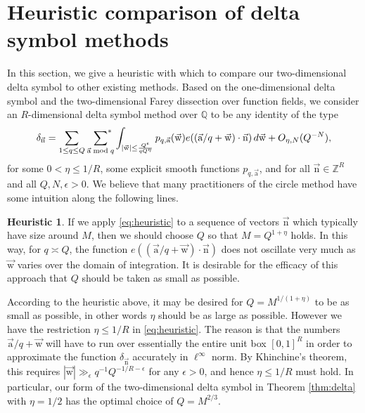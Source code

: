 \documentclass[letterpaper,11pt]{amsart}
\numberwithin{equation}{section}
\theoremstyle{definition}
\newtheorem{heuristic}{Heuristic}
\numberwithin{equation}{section}
\newcommand{\ZZ}{\mathbb{Z}}
\newcommand{\QQ}{\mathbb{Q}}
\newcommand{\starsum}{\sideset{}{^*}\sum}
\newcommand{\ua}{\vec{\mathrm{a}}}
\newcommand{\uw}{{\vec{\mathrm{w}}}}
\newcommand{\nn}{\vec{\mathrm{n}}}
\begin{document}
\section{Heuristic comparison of delta symbol methods}
\label{sec:heuristic}
In this section, we give a heuristic with which to compare our two-dimensional delta symbol to other existing methods. 
Based on the one-dimensional delta symbol and the  two-dimensional Farey dissection over function fields, we consider an $R$-dimensional delta symbol method over \(\QQ\) to be any identity of the type
	\begin{equation}\label{eq:heuristic}
			\delta_{\nn}
			=
			\sum_{1\leq q\leq Q}
			\ {\starsum_{\ua\bmod{q}}}
    \int_{\substack{|\uw|\leq \frac{Q^\epsilon}{qQ^{\eta}}}}
			p_{q,\ua}(\uw)
			e((\ua/q+\uw)\cdot\nn)\,d\uw
			+O_{\eta,N}(Q^{-N}),
	\end{equation}
for some \(0<\eta\leq 1/R\), some explicit smooth functions $p_{q,\ua}$, and for all \(\nn\in\ZZ^R\) and all \(Q,N,\epsilon>0\).
We believe that many practitioners of the circle method have some intuition along the following lines. 
\begin{heuristic}\label{babyheu}
    If we apply \eqref{eq:heuristic} to a sequence of vectors \(\nn\) which typically have size around $M$, then we should choose $Q$ so that $M=Q^{1+\eta}$ holds. In this way, for \(q\asymp Q\), the function $e((\ua/q+\uw)\cdot\nn)$ does not oscillate very much as $\uw$ varies over the domain of integration. It is desirable for the efficacy of this approach that $Q$ should be taken as small as possible.
\end{heuristic}

According to the heuristic above, it may be desired for $Q=M^{1/(1+\eta)}$ to be as small as possible, in other words $\eta$ should be as large as possible.
However we have the restriction $\eta \leq 1/R$ in  \eqref{eq:heuristic}. The reason is that
the numbers \(\ua/q+\uw\) will have to run over essentially the entire unit box \([0,1]^R\) in order to approximate the function \(\delta_{\nn}\) accurately in $\ell^\infty$ norm. By Khinchine's theorem, this requires \(|\uw|\gg_\epsilon q^{-1}Q^{-1/R-\epsilon}\) for any \(\epsilon>0\), and hence \(\eta\leq 1/R\) must hold.
In particular, our form of the  two-dimensional delta symbol in Theorem \ref{thm:delta} with \(\eta =1/2\) has the optimal choice of $Q=M^{2/3}$. 
 
\end{document}
